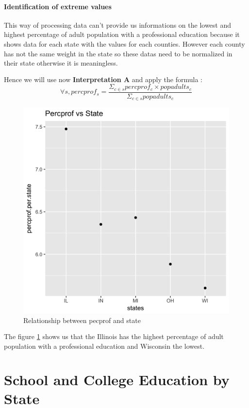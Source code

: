 \documentclass{article}
\begin{document}
\paragraph{Identification of extreme values}
This way of processing data can't provide us informations on the lowest and highest percentage of adult population with a professional education because it shows data for each state with the values for each counties. However each county has not the same weight in the state so these datas need to be normalized in their state otherwise it is meaningless.

Hence we will use now \textbf{Interpretation A} and apply the formula : 
\begin{equation}
\forall s, percprof_{s} = \frac{\Sigma_{c \in s} percprof_{c} \times popadults_{c}}{ \Sigma_{c \in s} popadults_{c}}
\end{equation}

\begin{figure}[!ht]
\centering
\includegraphics[width=.8\textwidth]{plot_question1.png}
 \caption{Relationship between pecprof and state}
\label{question1}
\end{figure}

The figure \ref{question1} shows us that the Illinois has the highest percentage of adult population with a professional education and Wisconsin the lowest.

\section{School and College Education by State}
\end{document}
